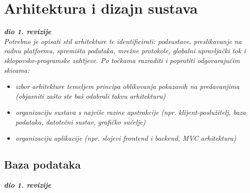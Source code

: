 \chapter{Arhitektura i dizajn sustava}
		
		\textbf{\textit{dio 1. revizije}}\\

		\textit{ Potrebno je opisati stil arhitekture te identificirati: podsustave, preslikavanje na radnu platformu, spremišta podataka, mrežne protokole, globalni upravljački tok i sklopovsko-programske zahtjeve. Po točkama razraditi i popratiti odgovarajućim skicama:}
	\begin{itemize}
		\item 	\textit{izbor arhitekture temeljem principa oblikovanja pokazanih na predavanjima (objasniti zašto ste baš odabrali takvu arhitekturu)}
		\item 	\textit{organizaciju sustava s najviše razine apstrakcije (npr. klijent-poslužitelj, baza podataka, datotečni sustav, grafičko sučelje)}
		\item 	\textit{organizaciju aplikacije (npr. slojevi frontend i backend, MVC arhitektura) }		
	\end{itemize}

	
		

		

				
		\section{Baza podataka}
			
			\textbf{\textit{dio 1. revizije}}\\
			
